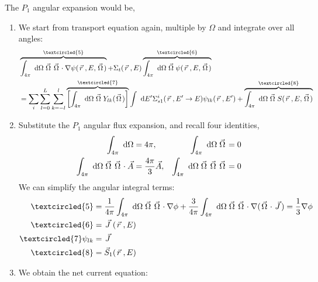 \documentclass{school-22.211-notes}
\begin{document}
The $P_1$ angular expansion would be, 

\begin{enumerate}
\item We start from transport equation again, multiple by $\Omega$ and integrate over all angles: 
\begin{align}
& \overbrace{\int_{4\pi} \dOmega \vecOmega \vecOmega \cdot \gradient \psi(\vecr, E, \vecOmega)}^{\textcircled{5}} 
+ \Sigma_t (\vecr, E) \overbrace{\int_{4\pi} \dOmega \vecOmega \psi(\vecr, E, \vecOmega)}^{\textcircled{6}} \\
&= \Sum_i \Sum_{l=0}^L \Sum_{k=-l}^l \overbrace{\left[\int_{4\pi} \dOmega \vecOmega Y_{lk} (\vecOmega) \right]}^{\textcircled{7}} \int \dE' \Sigma_{s1}^i (\vecr, E'\to E) \psi_{lk}(\vecr, E') 
+ \overbrace{\int_{4\pi} \dOmega \vecOmega S(\vecr, E, \vecOmega)}^{\textcircled{8}} 
\end{align}

\item Substitute the $P_1$ angular flux expansion, 
and recall four identities,
\begin{align}
\int_{4\pi} \mbox{ }\mathrm{d} \Omega &= 4 \pi, & \int_{4\pi} \mbox{ }\mathrm{d} \Omega \left.\vec{\Omega}\right. &= 0 \\
\int_{4\pi} \mbox{ }\mathrm{d} \Omega \left.\vec{\Omega}\right. \left.\vec{\Omega}\right. \cdot \vec{A} &= \frac{4\pi}{3} \vec{A}, & \int_{4\pi} \mbox{ }\mathrm{d} \Omega \left.\vec{\Omega}\right. \left.\vec{\Omega}\right. \left.\vec{\Omega}\right. &= 0 
\end{align}
We can simplify the angular integral terms:
\begin{align}
\textcircled{5} &= \frac{1}{4\pi} \int_{4\pi} \dOmega \vecOmega \vecOmega \cdot \gradient \phi + \frac{3}{4\pi} \int_{4\pi} \dOmega \vecOmega \vecOmega \cdot \gradient (\vecOmega \cdot \vecJ) = \frac{1}{3} \gradient \phi \\
\textcircled{6} &= \vecJ (\vecr, E) \\
\textcircled{7} \psi_{lk} &= \vecJ \\
\textcircled{8} &= \vec{S}_1 (\vecr, E) 
\end{align}







\item We obtain the net current equation:
\end{enumerate}
\end{document}
